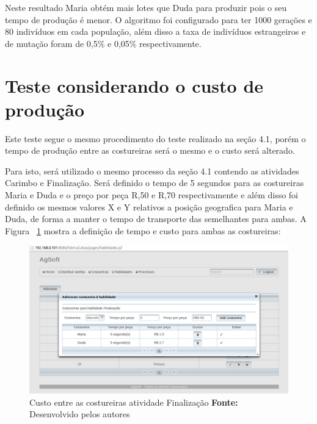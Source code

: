 \par Neste resultado Maria obtém mais lotes que Duda para produzir pois o seu
tempo de produção é menor. O algoritmo foi configurado para ter 1000
gerações e 80 indivíduos em cada população, além disso a taxa de indivíduos estrangeiros e de mutação 
foram de 0,5\% e 0,05\% respectivamente.


\section{Teste considerando o custo de produção}

\par Este teste segue o mesmo procedimento do teste realizado na seção 4.1,
porém o tempo de produção entre as costureiras será o mesmo e o custo será
alterado.

\par Para isto, será utilizado o mesmo processo da seção 4.1 contendo as
atividades Carimbo e Finalização. Será definido o tempo de 5 segundos para as
costureiras Maria e Duda e o preço por peça R,50 e R,70 respectivamente e além disso foi definido os mesmos valores X e Y  
relativos a posição geografica para Maria e Duda, de forma a manter o tempo de
transporte das semelhantes para ambas. A Figura
~\ref{fig:custo_entre_costureiras} mostra a definição de tempo e custo para
ambas as costureiras:



\begin{figure}[h!]
	\centerline{\includegraphics[scale=0.4]{./imagens/custo_entre_costureiras_teste2.png}}
	\caption[Custo entre as costureiras atividade Finalização]
	{Custo entre as costureiras atividade Finalização \textbf{Fonte:} Desenvolvido pelos autores}
	\label{fig:custo_entre_costureiras}
\end{figure}



